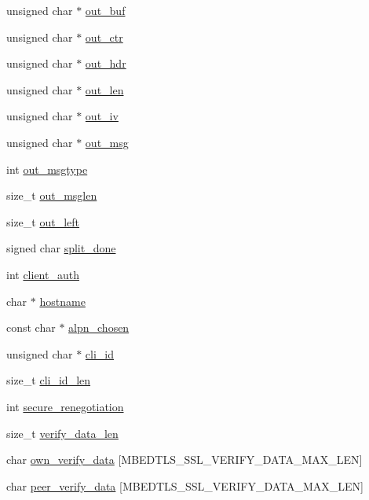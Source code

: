 \begin{DoxyCompactItemize}
unsigned char $\ast$ \hyperlink{structmbedtls__ssl__context_a77df97cbed2923f1162034c6e9c2ad4d}{out\-\_\-buf}
\item 
unsigned char $\ast$ \hyperlink{structmbedtls__ssl__context_aa738cee1fd289e5c8686ab355d591203}{out\-\_\-ctr}
\item 
unsigned char $\ast$ \hyperlink{structmbedtls__ssl__context_a02d820fa0a4f09e5b5a69b71de4cc125}{out\-\_\-hdr}
\item 
unsigned char $\ast$ \hyperlink{structmbedtls__ssl__context_a492e5b5ecc58e0f68c7498eaa07fc273}{out\-\_\-len}
\item 
unsigned char $\ast$ \hyperlink{structmbedtls__ssl__context_ab2e382571a395990024d82a47dadf565}{out\-\_\-iv}
\item 
unsigned char $\ast$ \hyperlink{structmbedtls__ssl__context_a6398baeb1222e1b166531b8528800a20}{out\-\_\-msg}
\item 
int \hyperlink{structmbedtls__ssl__context_a847547cec75d00533c8c0373f6eaa759}{out\-\_\-msgtype}
\item 
size\-\_\-t \hyperlink{structmbedtls__ssl__context_aa004c925da73e2536e74ce8d36aefcb0}{out\-\_\-msglen}
\item 
size\-\_\-t \hyperlink{structmbedtls__ssl__context_a8b9ef7c3cfd17efdc2eacddf4dbfb409}{out\-\_\-left}
\item 
signed char \hyperlink{structmbedtls__ssl__context_a0b9cdd63126690b0071c5b1821153a5a}{split\-\_\-done}
\item 
int \hyperlink{structmbedtls__ssl__context_aac814a12725174dd9da1b1815b0abac0}{client\-\_\-auth}
\item 
char $\ast$ \hyperlink{structmbedtls__ssl__context_a32d4187f88ff6a5153cfd85c6a752cb9}{hostname}
\item 
const char $\ast$ \hyperlink{structmbedtls__ssl__context_a858fd8077042db3804cd2e4aef9e2f20}{alpn\-\_\-chosen}
\item 
unsigned char $\ast$ \hyperlink{structmbedtls__ssl__context_a25bf8a5a798a1082db3b1e0f40de6161}{cli\-\_\-id}
\item 
size\-\_\-t \hyperlink{structmbedtls__ssl__context_a2d748130fb769af23d736f462a0bc913}{cli\-\_\-id\-\_\-len}
\item 
int \hyperlink{structmbedtls__ssl__context_ad7865b811cb03e5f4327102d555769d1}{secure\-\_\-renegotiation}
\item 
size\-\_\-t \hyperlink{structmbedtls__ssl__context_a06b667bf3672f8d480f962970c5adc7d}{verify\-\_\-data\-\_\-len}
\item 
char \hyperlink{structmbedtls__ssl__context_a55b04578ece6b1621c8f1629481506f1}{own\-\_\-verify\-\_\-data} \mbox{[}M\-B\-E\-D\-T\-L\-S\-\_\-\-S\-S\-L\-\_\-\-V\-E\-R\-I\-F\-Y\-\_\-\-D\-A\-T\-A\-\_\-\-M\-A\-X\-\_\-\-L\-E\-N\mbox{]}
\item 
char \hyperlink{structmbedtls__ssl__context_a75c8c793f5cff7b0892f0616a40cede7}{peer\-\_\-verify\-\_\-data} \mbox{[}M\-B\-E\-D\-T\-L\-S\-\_\-\-S\-S\-L\-\_\-\-V\-E\-R\-I\-F\-Y\-\_\-\-D\-A\-T\-A\-\_\-\-M\-A\-X\-\_\-\-L\-E\-N\mbox{]}
\end{DoxyCompactItemize}


